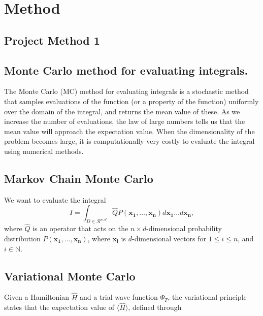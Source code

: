 \section{Method}\label{sec:Method}

\subsection{Project Method 1}\label{sec:project method}

\subsection*{Monte Carlo method for evaluating integrals.}
The Monte Carlo (MC) method for evaluating integrals is a stochastic method that samples evaluations of the function (or a property of the function) uniformly over the domain of the integral, and returns the mean value of these. As we increase the number of evaluations, the law of large numbers tells us that the mean value will approach the expectation value. When the dimensionality of the problem becomes large, it is computationally very costly to evaluate the integral using numerical methods.

\subsection*{Markov Chain Monte Carlo}
We want to evaluate the integral 
\begin{equation}
    I = \int_{D\in\mathcal{R^{n, d}}}\hat{Q}P(\mathbf{x_1}, \dots, \mathbf{x_n})d\mathbf{x_1}\dots d\mathbf{x_n},
\end{equation}
where $\hat{Q}$ is an operator that acts on the $n\times d$-dimensional probability distribution $P(\mathbf{x_1}, \dots, \mathbf{x_n})$, where $\mathbf{x_i}$ is $d$-dimensional vectors for $1\leq i\leq n$, and $i\in\mathbb{N}$. 

\subsection*{Variational Monte Carlo}
Given a Hamiltonian $\hat{H}$ and a trial wave function $\Psi_T$, the variational principle states that the expectation value of $\langle \hat{H} \rangle$, defined through

